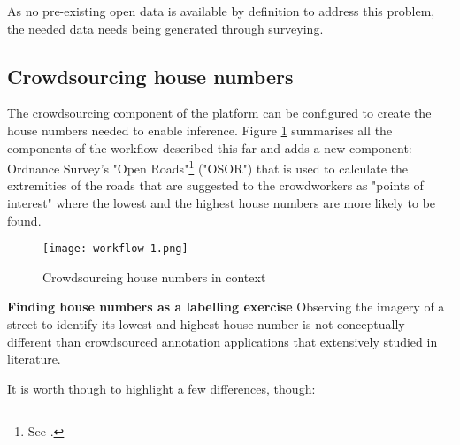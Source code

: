 As no pre-existing open data is available by definition to address this problem, the needed data needs being generated through surveying. 

\subsection{Crowdsourcing house numbers}

The crowdsourcing component of the platform can be configured to create the house numbers needed to enable inference. Figure \ref{fig:workflow_1} summarises all the components of the workflow described this far and adds a new component: Ordnance Survey's "Open Roads"\footnote{See \url{}.} ("OSOR") that is used to calculate the extremities of the roads that are suggested to the crowdworkers as "points of interest" where the lowest and the highest house numbers are more likely to be found.

\begin{figure}
	\texttt{[image: workflow-1.png]}
	\caption{Crowdsourcing house numbers in context}
	\label{fig:workflow_1}
\end{figure}

\textbf{Finding house numbers as a labelling exercise} Observing the imagery of a street to identify its lowest and highest house number is not conceptually different than crowdsourced annotation applications that extensively studied in literature. 

It is worth though to highlight a few differences, though:

